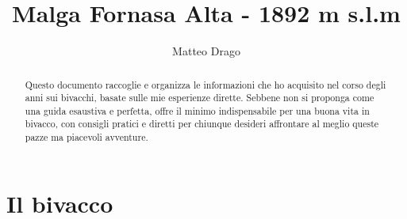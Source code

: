 \documentclass{article}
\title{\textbf{Malga Fornasa Alta - 1892 m s.l.m}}
\author{Matteo Drago}
\begin{document}
\maketitle
\thispagestyle{fancy} %

\begin{abstract}
Questo documento raccoglie e organizza le informazioni che ho acquisito nel corso degli anni sui bivacchi, basate sulle mie esperienze dirette. Sebbene non si proponga come una guida esaustiva e perfetta, offre il minimo indispensabile per una buona vita in bivacco, con consigli pratici e diretti per chiunque desideri affrontare al meglio queste pazze ma piacevoli avventure.
\end{abstract}

\section{Il bivacco}
\end{document}
